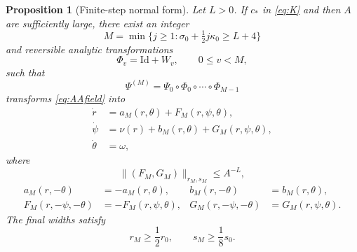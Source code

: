 \documentclass[11pt]{amsart}
\newtheorem{proposition}[theorem]{Proposition}
\theoremstyle{remark}
\newcommand{\norm}[1]{\lVert #1\rVert}
\newcommand{\Id}{\mathrm{Id}}
\begin{document}
\begin{proposition}[Finite-step normal form]\label{prop:nf}
Let $L>0$.  If $c_*$ in \eqref{eq:K} and then $A$ are sufficiently large,
there exist an integer
\begin{equation}\label{eq:Mchoice}
 M=\min\{j\geq1:\sigma_0+\tfrac12j\kappa_0\geq L+4\}
\end{equation}
and reversible analytic transformations
\[
 \Phi_v=\Id+W_v,\qquad 0\leq v<M,
\]
such that
\[
 \Psi^{(M)}=\Psi_0\circ\Phi_0\circ\cdots\circ\Phi_{M-1}
\]
transforms \eqref{eq:AAfield} into
\begin{equation}\label{eq:NFfinal}
 \begin{aligned}
 \dot r&=a_M(r,\theta)+F_M(r,\psi,\theta),\\
 \dot\psi&=\nu(r)+b_M(r,\theta)+G_M(r,\psi,\theta),\\
 \dot\theta&=\omega,
 \end{aligned}
\end{equation}
where
\begin{equation}\label{eq:finalsmall}
 \norm{(F_M,G_M)}_{r_M,s_M}\leq A^{-L},
\end{equation}
\begin{equation}\label{eq:finalparity}
 \begin{aligned}
 a_M(r,-\theta)&=-a_M(r,\theta),&
 b_M(r,-\theta)&= b_M(r,\theta),\\
 F_M(r,-\psi,-\theta)&=-F_M(r,\psi,\theta),&
 G_M(r,-\psi,-\theta)&= G_M(r,\psi,\theta).
 \end{aligned}
\end{equation}
The final widths satisfy
\[
 r_M\geq\frac12r_0,\qquad s_M\geq\frac18s_0.
\]
\end{proposition}
\end{document}
